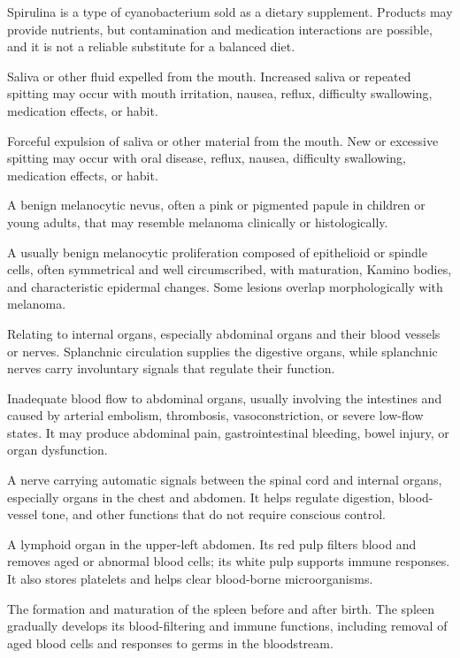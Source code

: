  Spirulina is a type of cyanobacterium sold as a dietary supplement. Products may provide nutrients, but contamination and medication interactions are possible, and it is not a reliable substitute for a balanced diet.

 Saliva or other fluid expelled from the mouth. Increased saliva or repeated spitting may occur with mouth irritation, nausea, reflux, difficulty swallowing, medication effects, or habit.

 Forceful expulsion of saliva or other material from the mouth. New or excessive spitting may occur with oral disease, reflux, nausea, difficulty swallowing, medication effects, or habit.

 A benign melanocytic nevus, often a pink or pigmented papule in children or young adults, that may resemble melanoma clinically or histologically.

 A usually benign melanocytic proliferation composed of epithelioid or spindle cells, often symmetrical and well circumscribed, with maturation, Kamino bodies, and characteristic epidermal changes. Some lesions overlap morphologically with melanoma.

 Relating to internal organs, especially abdominal organs and their blood vessels or nerves. Splanchnic circulation supplies the digestive organs, while splanchnic nerves carry involuntary signals that regulate their function.

 Inadequate blood flow to abdominal organs, usually involving the intestines and caused by arterial embolism, thrombosis, vasoconstriction, or severe low-flow states. It may produce abdominal pain, gastrointestinal bleeding, bowel injury, or organ dysfunction.

 A nerve carrying automatic signals between the spinal cord and internal organs, especially organs in the chest and abdomen. It helps regulate digestion, blood-vessel tone, and other functions that do not require conscious control.

 A lymphoid organ in the upper-left abdomen. Its red pulp filters blood and removes aged or abnormal blood cells; its white pulp supports immune responses. It also stores platelets and helps clear blood-borne microorganisms.

 The formation and maturation of the spleen before and after birth. The spleen gradually develops its blood-filtering and immune functions, including removal of aged blood cells and responses to germs in the bloodstream.

